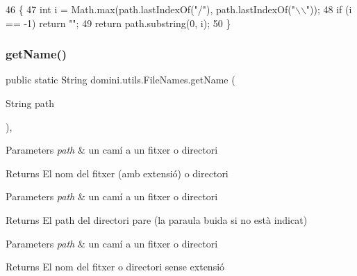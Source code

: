 \begin{DoxyCode}
46                                                   \{
47         \textcolor{keywordtype}{int} i = Math.max(path.lastIndexOf(\textcolor{stringliteral}{"/"}), path.lastIndexOf(\textcolor{stringliteral}{"\(\backslash\)\(\backslash\)"}));
48         \textcolor{keywordflow}{if} (i == -1) \textcolor{keywordflow}{return} \textcolor{stringliteral}{""};
49         \textcolor{keywordflow}{return} path.substring(0, i);
50     \}
\end{DoxyCode}
\mbox{\label{classdomini_1_1utils_1_1FileNames_ade42cac265a0eb6d3bbccc671f669253}} 
\subsubsection{\texorpdfstring{get\+Name()}{getName()}}
{\footnotesize\ttfamily public static String domini.\+utils.\+File\+Names.\+get\+Name (\begin{DoxyParamCaption}\item[{String}]{path }\end{DoxyParamCaption})\hspace{0.3cm}{\ttfamily [inline]}, {\ttfamily [static]}}


\begin{DoxyParams}{Parameters}
{\em path} & un camí a un fitxer o directori \\
\hline
\end{DoxyParams}
\begin{DoxyReturn}{Returns}
El nom del fitxer (amb extensió) o directori
\end{DoxyReturn}

\begin{DoxyParams}{Parameters}
{\em path} & un camí a un fitxer o directori \\
\hline
\end{DoxyParams}
\begin{DoxyReturn}{Returns}
El path del directori pare (la paraula buida si no està indicat)
\end{DoxyReturn}

\begin{DoxyParams}{Parameters}
{\em path} & un camí a un fitxer o directori \\
\hline
\end{DoxyParams}
\begin{DoxyReturn}{Returns}
El nom del fitxer o directori sense extensió 
\end{DoxyReturn}

